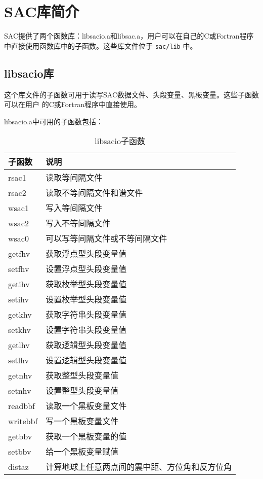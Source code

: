 \section{SAC库简介}
SAC提供了两个函数库：libsacio.a和libsac.a，用户可以在自己的C或Fortran程序
中直接使用函数库中的子函数。这些库文件位于 \texttt{sac/lib} 中。

\subsection{libsacio库}
这个库文件的子函数可用于读写SAC数据文件、头段变量、黑板变量。这些子函数可以在用户
的C或Fortran程序中直接使用。

libsacio.a中可用的子函数包括：
\begin{table}[H]
\centering
\caption{libsacio子函数}
\ttfamily
\begin{tabular}{ll}
\toprule
子函数      &       说明            \\
\midrule
rsac1       &       读取等间隔文件  \\
rsac2       &       读取不等间隔文件和谱文件    \\
wsac1       &       写入等间隔文件  \\
wsac2       &       写入不等间隔文件    \\
wsac0       &       可以写等间隔文件或不等间隔文件  \\
getfhv      &       获取浮点型头段变量值    \\
setfhv      &       设置浮点型头段变量值    \\
getihv      &       获取枚举型头段变量值    \\
setihv      &       设置枚举型头段变量值    \\
getkhv      &       获取字符串头段变量值    \\
setkhv      &       设置字符串头段变量值    \\
getlhv      &       获取逻辑型头段变量值    \\
setlhv      &       设置逻辑型头段变量值    \\
getnhv      &       获取整型头段变量值      \\
setnhv      &       设置整型头段变量值  \\
readbbf     &       读取一个黑板变量文件    \\
writebbf    &       写一个黑板变量文件      \\
getbbv      &       获取一个黑板变量的值    \\
setbbv      &       给一个黑板变量赋值      \\
distaz      &       计算地球上任意两点间的震中距、方位角和反方位角  \\
\bottomrule
\end{tabular}
\end{table}

